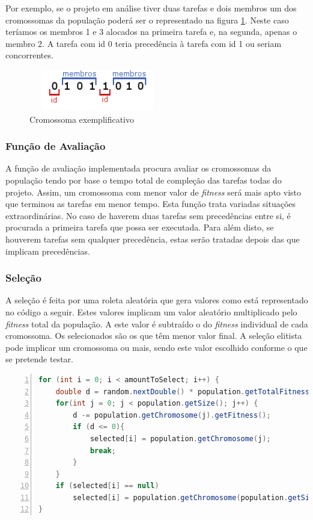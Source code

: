 \begin{titlepage}
Por exemplo, se o projeto em análise tiver duas tarefas e dois membros um dos cromossomas da população poderá ser o representado na figura \ref{cromossoma}. Neste caso teríamos os membros 1 e 3 alocados na primeira tarefa e, na segunda, apenas o membro 2. A tarefa com id 0 teria precedência à tarefa com id 1 ou seriam concorrentes.

\begin{figure}[h!]
  \centering
    \includegraphics[width=6cm, height = 1.8cm]{cromossoma.png}
  \caption{Cromossoma exemplificativo}
  \label{cromossoma}
\end{figure}

\subsubsection{Função de Avaliação}

A função de avaliação implementada procura avaliar os cromossomas da população tendo por base o tempo total de compleção das tarefas todas do projeto. Assim, um cromossoma com menor valor de \textit{fitness} será mais apto visto que terminou as tarefas em menor tempo. Esta função trata variadas situações extraordinárias. No caso de haverem duas tarefas sem precedências entre si, é procurada a primeira tarefa que possa ser executada. Para além disto, se houverem tarefas sem qualquer precedência, estas serão tratadas depois das que implicam precedências.

\subsubsection{Seleção}

A seleção é feita por uma roleta aleatória que gera valores como está representado no código a seguir. Estes valores implicam um valor aleatório multiplicado pelo \textit{fitness} total da população. A este valor é subtraído o do \textit{fitness} individual de cada cromossoma. Os selecionados são os que têm menor valor final.  A seleção elitista pode implicar um cromossoma ou mais, sendo este valor escolhido conforme o que se pretende testar.

\begin{lstlisting}[frame=single, language=java,numbers=left,numberfirstline=true]  
for (int i = 0; i < amountToSelect; i++) {
	double d = random.nextDouble() * population.getTotalFitness();	
	for(int j = 0; j < population.getSize(); j++) {		
		d -= population.getChromosome(j).getFitness();		
		if (d <= 0){
			selected[i] = population.getChromosome(j);
			break;
		}
	}
	if (selected[i] == null)
		selected[i] = population.getChromosome(population.getSize() - 1); // in case of rounding errors
}
\end{lstlisting}


\end{titlepage}
